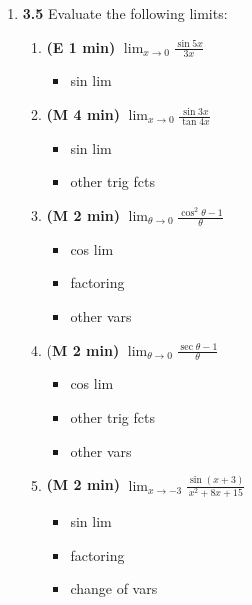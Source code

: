 \documentclass[12pt]{article}
\begin{document}
\begin{enumerate}[1.]
\item {\bf 3.5} Evaluate the following limits:
\begin{enumerate}
	\item {\bf (E 1 min)} $\displaystyle\lim_{x\to 0}\frac{\sin{5x}}{3x}$
	{\bf\begin{itemize}
\item sin lim
\end{itemize}}
	\item {\bf (M 4 min)} $\displaystyle\lim_{x\to 0}\frac{\sin{3x}}{\tan{4x}}$
	{\bf\begin{itemize}
\item sin lim
\item other trig fcts
\end{itemize}}
	\item {\bf (M 2 min)} $\displaystyle\lim_{\theta\to 0}\frac{\cos^2{\theta}-1}{\theta}$
	{\bf\begin{itemize}
\item cos lim
\item factoring
\item other vars
\end{itemize}}
	\item {(\bf M 2 min)} $\displaystyle\lim_{\theta\to 0}\frac{\sec{\theta}-1}{\theta}$
	{\bf\begin{itemize}
\item cos lim
\item other trig fcts
\item other vars
\end{itemize}}
	\item {\bf (M 2 min)} $\displaystyle\lim_{x\to -3}\frac{\sin{(x+3)}}{x^2+8x+15}$
	{\bf\begin{itemize}
\item sin lim
\item factoring
\item change of vars
\end{itemize}}
\end{enumerate}


\end{enumerate}
\end{document}

